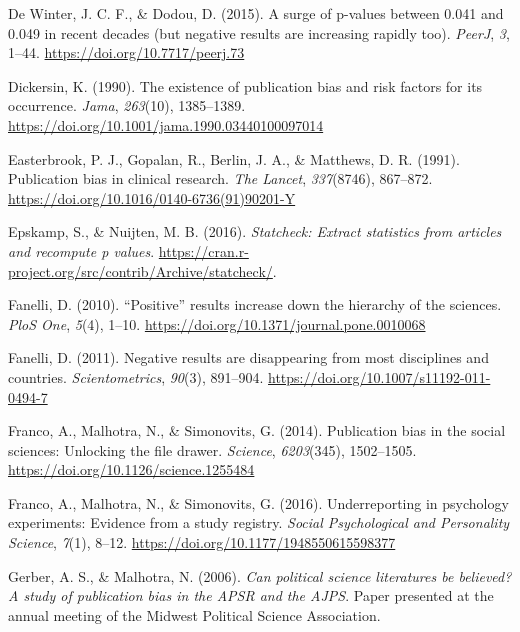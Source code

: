 \documentclass[
  12pt,
]{article}
\begin{document}
\leavevmode\hypertarget{ref-DeWinter}{}%
De Winter, J. C. F., \& Dodou, D. (2015). A surge of p-values between
0.041 and 0.049 in recent decades (but negative results are increasing
rapidly too). \emph{PeerJ}, \emph{3}, 1--44.
\url{https://doi.org/10.7717/peerj.73}

\leavevmode\hypertarget{ref-Dickersin}{}%
Dickersin, K. (1990). The existence of publication bias and risk factors
for its occurrence. \emph{Jama}, \emph{263}(10), 1385--1389.
\url{https://doi.org/10.1001/jama.1990.03440100097014}

\leavevmode\hypertarget{ref-Easterbrook}{}%
Easterbrook, P. J., Gopalan, R., Berlin, J. A., \& Matthews, D. R.
(1991). Publication bias in clinical research. \emph{The Lancet},
\emph{337}(8746), 867--872.
\url{https://doi.org/10.1016/0140-6736(91)90201-Y}

\leavevmode\hypertarget{ref-statcheck122}{}%
Epskamp, S., \& Nuijten, M. B. (2016). \emph{Statcheck: Extract
statistics from articles and recompute p values}.
\url{https://cran.r-project.org/src/contrib/Archive/statcheck/}.

\leavevmode\hypertarget{ref-Fanelli2010}{}%
Fanelli, D. (2010). ``Positive'' results increase down the hierarchy of
the sciences. \emph{PloS One}, \emph{5}(4), 1--10.
\url{https://doi.org/10.1371/journal.pone.0010068}

\leavevmode\hypertarget{ref-Fanelli2011}{}%
Fanelli, D. (2011). Negative results are disappearing from most
disciplines and countries. \emph{Scientometrics}, \emph{90}(3),
891--904. \url{https://doi.org/10.1007/s11192-011-0494-7}

\leavevmode\hypertarget{ref-Franco2014}{}%
Franco, A., Malhotra, N., \& Simonovits, G. (2014). Publication bias in
the social sciences: Unlocking the file drawer. \emph{Science},
\emph{6203}(345), 1502--1505.
\url{https://doi.org/10.1126/science.1255484}

\leavevmode\hypertarget{ref-Franco2016}{}%
Franco, A., Malhotra, N., \& Simonovits, G. (2016). Underreporting in
psychology experiments: Evidence from a study registry. \emph{Social
Psychological and Personality Science}, \emph{7}(1), 8--12.
\url{https://doi.org/10.1177/1948550615598377}

\leavevmode\hypertarget{ref-Gerber2006}{}%
Gerber, A. S., \& Malhotra, N. (2006). \emph{Can political science
literatures be believed? A study of publication bias in the APSR and the
AJPS}. Paper presented at the annual meeting of the Midwest Political
Science Association.
\end{document}

